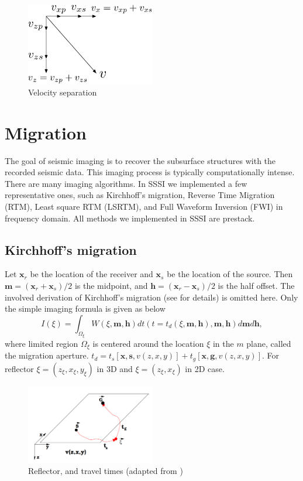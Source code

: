 \documentclass[11pt]{article}
\newcommand{\bx}{\boldsymbol{x}}
\newcommand{\bg}{\boldsymbol{g}}
\newcommand{\bh}{\boldsymbol{h}}
\newcommand{\bs}{\boldsymbol{s}}
\newcommand{\bm}{\boldsymbol{m}}
\theoremstyle{plain}
\theoremstyle{definition}
\theoremstyle{remark}
\numberwithin{equation}{section}
\begin{document}
    \begin{figure}
    \centering
    \includegraphics[width=0.5\textwidth]{Fig/EWCoordinates.pdf}
    \caption{Velocity separation}
    \end{figure}
    

\section{Migration}
The goal of seismic imaging is to recover the subsurface structures with the recorded seismic data. This imaging process is 
typically computationally intense. There are many imaging algorithms. In SSSI we implemented a few representative ones, such as
Kirchhoff's migration, Reverse Time Migration (RTM), Least square RTM (LSRTM), and Full Waveform Inversion (FWI) in frequency domain.
All methods we implemented in SSSI are prestack.  

\subsection{Kirchhoff's migration}
Let $\bx_r$ be the location of the receiver and $\bx_s$ be the location of the source. 
Then $\bm=(\bx_r+\bx_s)/2$ is the midpoint, and $\bh=(\bx_r-\bx_s)/2$ is the half offset.
The involved derivation of Kirchhoff's migration (see \cite{Sch1978} for details) is omitted here. Only the simple imaging formula 
is given as below
\begin{equation}
I(\xi)=\int_{\Omega_\xi} W(\xi,\bm,\bh)dt(t=t_d(\xi,
\bm,\bh),\bm,\bh)d\bm d\bh,
\end{equation}
where limited region $\Omega_\xi$ is centered around the location $\xi$
in the $m$ plane, called the migration aperture. $t_d=t_s[\bx,\bs,v(z,x,y)]+t_g[\bx,\bg,v(z,x,y)]$.
For reflector $\xi = (z_\xi, x_\xi, y_\xi)$ in 3D and $\xi = (z_\xi, x_\xi)$ in 2D case.

  \begin{figure}
  \centering
  \includegraphics[width=0.5\textwidth]{Fig/tstg.PNG}
  \caption{Reflector, and travel times (adapted from \cite{bio2006})}
  \end{figure}
  
\end{document}
